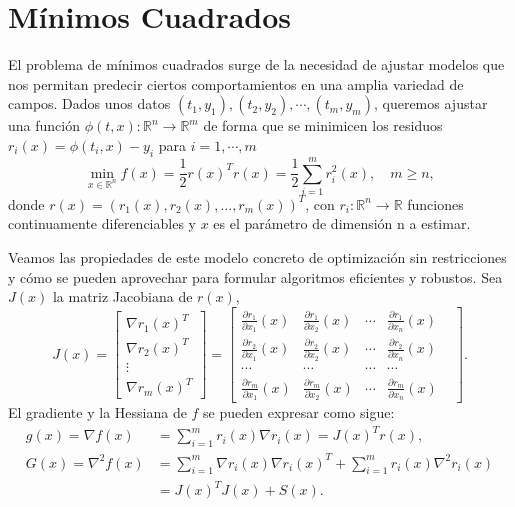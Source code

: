 \documentclass[11pt,a4paper]{book}
\theoremstyle{definition}
\theoremstyle{remark}
\begin{document}
\chapter{Mínimos Cuadrados}\label{ch:lsqp}

El problema de mínimos cuadrados surge de la necesidad de ajustar modelos que nos permitan predecir ciertos comportamientos en una amplia variedad de campos. Dados unos datos $(t_1,y_1),(t_2,y_2),\cdots,(t_m,y_m)$, queremos ajustar una función
$\phi(t,x):\mathbb{R}^{n} \rightarrow \mathbb{R}^{m}$ de forma que se minimicen los residuos $r_i(x) = \phi(t_i,x) - y_i$ para $i=1,\cdots,m$
\begin{equation}
	\min_{x\in \mathbb{R}^{n}}f(x) = \frac{1}{2} r(x)^Tr(x) = \frac{1}{2}\sum_{i=1}^{m}r_i^2(x), \quad m\geq n,
	\label{eq:lsp}
\end{equation}
donde $r(x) = (r_1(x), r_2(x), \ldots, r_m(x))^T$, con $r_i : \mathbb{R}^{n} \rightarrow \mathbb{R}$
funciones continuamente diferenciables y $x$ es el parámetro de dimensión n a estimar.


Veamos las propiedades de este modelo concreto de optimización sin restricciones y cómo se pueden aprovechar para formular algoritmos eficientes y robustos.
Sea $J(x)$ la matriz Jacobiana de $r(x)$, 
\begin{equation}
	J(x) = 
	\begin{bmatrix}
		\nabla r_1(x)^T \\
		\nabla r_2(x)^T \\
		\vdots \\
		\nabla r_m(x)^T
	\end{bmatrix}
	=
	\begin{bmatrix}
		\frac{\partial r_1}{\partial x_1}(x) &
		\frac{\partial r_1}{\partial x_2}(x) &
		\cdots &
		\frac{\partial r_1}{\partial x_n}(x) \\
		
		\frac{\partial r_2}{\partial x_1}(x) &
		\frac{\partial r_2}{\partial x_2}(x) &
		\cdots &
		\frac{\partial r_2}{\partial x_n}(x) \\
		
		\cdots &
		\cdots &
		\cdots &
		\cdots & \\
		
		\frac{\partial r_m}{\partial x_1}(x) &
		\frac{\partial r_m}{\partial x_2}(x) &
		\cdots &
		\frac{\partial r_m}{\partial x_n}(x) 
	\end{bmatrix}.
\end{equation}
El gradiente y la Hessiana de $f$ se pueden expresar como sigue:
\begin{align}
	g(x) = \nabla f(x) &= \sum_{i=1}^m r_i(x) \nabla r_i(x) = J(x)^Tr(x), \label{eq:grad}\\
	G(x) = \nabla^2 f(x) &= \sum_{i=1}^m \nabla r_i(x) \nabla r_i(x)^T + \sum_{i=1}^m r_i(x)\nabla^2r_i(x) \nonumber \\
	&= J(x)^TJ(x)+S(x). \label{eq:hess}
\end{align}
\end{document}
